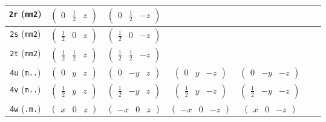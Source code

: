 \documentclass[fleqn,9pt,landscape]{jsarticle}
\begin{document}
\begin{center}
\begin{longtable}{ccccccc}
{\tt 2r} ({\tt mm2}) & $ \begin{pmatrix} 0 & \frac{1}{2} & z \end{pmatrix} $ & $ \begin{pmatrix} 0 & \frac{1}{2} & - z \end{pmatrix} $ & $  $ & $  $ & $  $ & $  $ \\ \hline
{\tt 2s} ({\tt mm2}) & $ \begin{pmatrix} \frac{1}{2} & 0 & z \end{pmatrix} $ & $ \begin{pmatrix} \frac{1}{2} & 0 & - z \end{pmatrix} $ & $  $ & $  $ & $  $ & $  $ \\ \hline
{\tt 2t} ({\tt mm2}) & $ \begin{pmatrix} \frac{1}{2} & \frac{1}{2} & z \end{pmatrix} $ & $ \begin{pmatrix} \frac{1}{2} & \frac{1}{2} & - z \end{pmatrix} $ & $  $ & $  $ & $  $ & $  $ \\ \hline
{\tt 4u} ({\tt m..}) & $ \begin{pmatrix} 0 & y & z \end{pmatrix} $ & $ \begin{pmatrix} 0 & - y & z \end{pmatrix} $ & $ \begin{pmatrix} 0 & y & - z \end{pmatrix} $ & $ \begin{pmatrix} 0 & - y & - z \end{pmatrix} $ & $  $ & $  $ \\ \hline
{\tt 4v} ({\tt m..}) & $ \begin{pmatrix} \frac{1}{2} & y & z \end{pmatrix} $ & $ \begin{pmatrix} \frac{1}{2} & - y & z \end{pmatrix} $ & $ \begin{pmatrix} \frac{1}{2} & y & - z \end{pmatrix} $ & $ \begin{pmatrix} \frac{1}{2} & - y & - z \end{pmatrix} $ & $  $ & $  $ \\ \hline
{\tt 4w} ({\tt .m.}) & $ \begin{pmatrix} x & 0 & z \end{pmatrix} $ & $ \begin{pmatrix} - x & 0 & z \end{pmatrix} $ & $ \begin{pmatrix} - x & 0 & - z \end{pmatrix} $ & $ \begin{pmatrix} x & 0 & - z \end{pmatrix} $ & $  $ & $  $ \\ \hline

\end{longtable}
\end{center}
\end{document}
